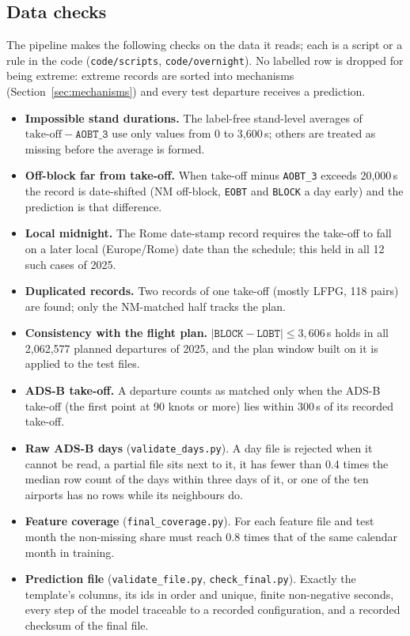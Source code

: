 \documentclass[
  manuscript=article,
  layout=preprint,
  year=2026,
  volume=x,
]{extra/joas}
\newcommand{\fld}[1]{\texttt{#1}}
\begin{document}
\subsection{Data checks}
\label{sec:checks}

The pipeline makes the following checks on the data it reads; each is a script or a rule in the code (\texttt{code/scripts},
\texttt{code/overnight}). No labelled row is dropped for being extreme: extreme records are sorted into mechanisms
(Section~\ref{sec:mechanisms}) and every test departure receives a prediction.
\begin{itemize}
  \item \textbf{Impossible stand durations.} The label-free stand-level averages of $\mathrm{take\text{-}off} - \fld{AOBT\_3}$ use only
  values from 0 to 3,600\,s; others are treated as missing before the average is formed.
  \item \textbf{Off-block far from take-off.} When take-off minus \fld{AOBT\_3} exceeds 20,000\,s the record is date-shifted (NM
  off-block, \fld{EOBT} and \fld{BLOCK} a day early) and the prediction is that difference.
  \item \textbf{Local midnight.} The Rome date-stamp record requires the take-off to fall on a later local (Europe/Rome) date than the
  schedule; this held in all 12 such cases of 2025.
  \item \textbf{Duplicated records.} Two records of one take-off (mostly LFPG, 118 pairs) are found; only the NM-matched half tracks the
  plan.
  \item \textbf{Consistency with the flight plan.} $|\fld{BLOCK} - \fld{LOBT}| \le 3{,}606$\,s holds in all 2,062,577 planned departures
  of 2025, and the plan window built on it is applied to the test files.
  \item \textbf{ADS-B take-off.} A departure counts as matched only when the ADS-B take-off (the first point at 90 knots or more) lies
  within 300\,s of its recorded take-off.
  \item \textbf{Raw ADS-B days} (\texttt{validate\_days.py}). A day file is rejected when it cannot be read, a partial file sits next to
  it, it has fewer than 0.4 times the median row count of the days within three days of it, or one of the ten airports has no rows
  while its neighbours do.
  \item \textbf{Feature coverage} (\texttt{final\_coverage.py}). For each feature file and test month the non-missing share must reach
  0.8 times that of the same calendar month in training.
  \item \textbf{Prediction file} (\texttt{validate\_file.py}, \texttt{check\_final.py}). Exactly the template's columns, its ids in order
  and unique, finite non-negative seconds, every step of the model traceable to a recorded configuration, and a recorded checksum of
  the final file.
\end{itemize}
\end{document}
